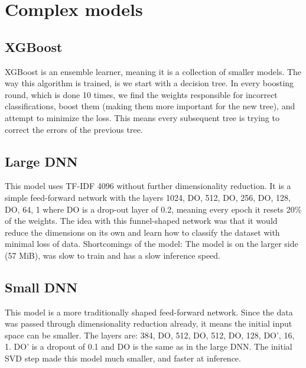 \section{Complex models}
\subsection{XGBoost}
XGBoost is an ensemble learner, meaning it is a collection of smaller models. The way this algorithm is trained, is we start with a decision tree. In every boosting round, which is done 10 times, we find the weights responsible for incorrect classifications, boost them (making them more important for the new tree), and attempt to minimize the loss. This means every subsequent tree is trying to correct the errors of the previous tree.

\subsection{Large DNN}
This model uses TF-IDF 4096 without further dimensionality reduction. It is a simple feed-forward network with the
layers 1024, DO, 512, DO, 256, DO, 128, DO, 64, 1 where DO is a drop-out layer of 0.2, meaning every epoch it resets 20\%
of the weights. The idea with this funnel-shaped network was that it would reduce the dimensions on its own and learn
how to classify the dataset with minimal loss of data. Shortcomings of the model: The model is on the larger side (57 MiB), was slow to train and has a slow inference speed.

\subsection{Small DNN}
This model is a more traditionally shaped feed-forward network. Since the data was passed through dimensionality reduction
already, it means the initial input space can be smaller. The layers are: 384, DO, 512, DO, 512, DO, 128, DO', 16, 1.
DO' is a dropout of 0.1 and DO is the same as in the large DNN. The initial SVD step made this model much smaller, and faster at inference.
